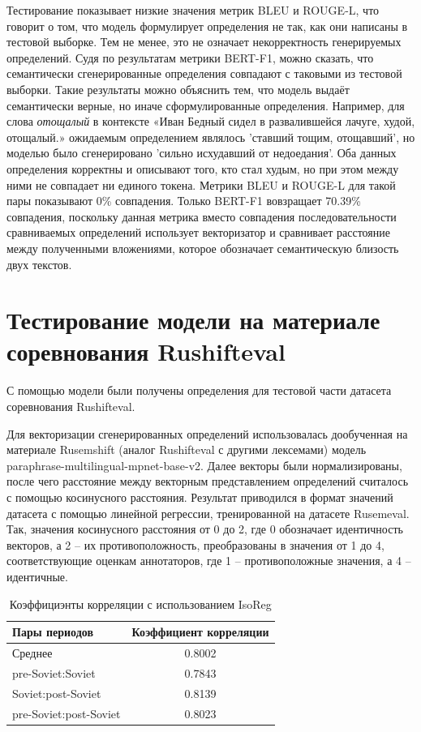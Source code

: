 \documentclass[LI,VKR]{HSEUniversity}
\begin{document}
Тестирование показывает низкие значения метрик BLEU и ROUGE-L,
что говорит о том, что модель формулирует определения не так,
как они написаны в тестовой выборке.
Тем не менее, это не означает некорректность генерируемых определений.
Судя по результатам метрики BERT-F1, можно сказать, что семантически сгенерированные определения
совпадают с таковыми из тестовой выборки.
Такие результаты можно объяснить тем, что модель выдаёт семантически верные,
но иначе сформулированные определения.
Например, для слова \textit{отощалый} в контексте
«Иван Бедный сидел в развалившейся лачуге, худой, отощалый.»
ожидаемым определением являлось ’ставший тощим, отощавший’,
но моделью было сгенерировано ’сильно исхудавший от недоедания’.
Оба данных определения корректны и описывают того, кто стал худым,
но при этом между ними не совпадает ни единого токена.
Метрики BLEU и ROUGE-L для такой пары показывают 0\% совпадения.
Только BERT-F1 вовзращает 70.39\% совпадения,
поскольку данная метрика вместо совпадения последовательности сравниваемых определений
использует векторизатор и сравнивает расстояние между полученными вложениями,
которое обозначает семантическую близость двух текстов.

\section{Тестирование модели на материале соревнования Rushifteval}

С помощью модели были получены определения для тестовой части датасета соревнования Rushifteval.

Для векторизации сгенерированных определений использовалась дообученная на материале
Rusemshift (аналог Rushifteval с другими лексемами) модель paraphrase-multilingual-mpnet-base-v2.
Далее векторы были нормализированы, после чего расстояние между
векторным представлением определений считалось с помощью косинусного расстояния.
Результат приводился в формат значений датасета с помощью линейной регрессии,
тренированной на датасете Rusemeval.
Так, значения косинусного расстояния от 0 до 2, где 0 обозначает идентичность векторов,
а 2 – их противоположность, преобразованы в значения от 1 до 4,
соответствующие оценкам аннотаторов, где 1 – противоположные значения, а 4 – идентичные.

\begin{table}[H]
\centering
\caption{Коэффициэнты корреляции с использованием IsoReg}
\begin{tabular}{lc}
\hline
Пары периодов                  & Коэффициент корреляции \\
\hline
Среднее            & 0.8002                  \\
pre-Soviet:Soviet           & 0.7843                  \\
Soviet:post-Soviet          & 0.8139                  \\
pre-Soviet:post-Soviet      & 0.8023                  \\
\hline
\end{tabular}
\end{table}
\end{document}

